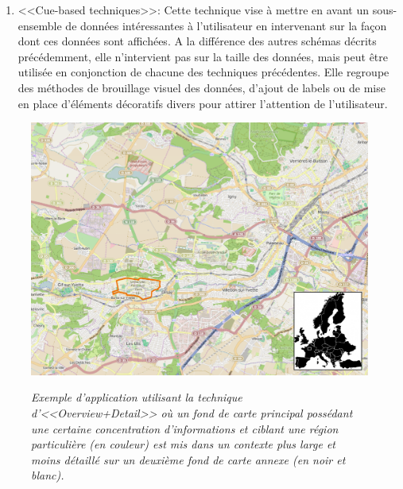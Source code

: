 \begin{enumerate}
    \item <<Cue-based techniques>>: Cette technique vise à mettre en avant un sous-ensemble de données intéressantes à l'utilisateur en intervenant sur la façon dont ces données sont affichées. A la différence des autres schémas décrits précédemment, elle n'intervient pas sur la taille des données, mais peut être utilisée en conjonction de chacune des techniques précédentes. Elle regroupe des méthodes de brouillage visuel des données, d'ajout de labels ou de mise en place d'éléments décoratifs divers pour attirer l'attention de l'utilisateur.
\end{enumerate}

\begin{figure}
  \centering
  {\includegraphics[width=.65\linewidth]{./figures/ch2/ch2_overview+detail}}
    \caption[Exemple utilisant la technique d'<<Overview+Detail>> sur une application de cartographie interactive.]{{\it Exemple d'application utilisant la technique d'<<Overview+Detail>> où un fond de carte principal possédant une certaine concentration d'informations et ciblant une région particulière (en couleur) est mis dans un contexte plus large et moins détaillé sur un deuxième fond de carte annexe (en noir et blanc).}}
  \label{Fig:overview+detail}
  \hspace{0.3cm}
\end{figure}

